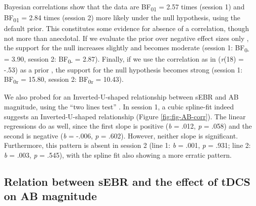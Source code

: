 \documentclass[11pt,english,]{memoir}
\begin{document}
Bayesian correlations show that the data are BF\textsubscript{01} = 2.57 times (session 1) and BF\textsubscript{01} = 2.84 times (session 2) more likely under the null hypothesis, using the default prior. This constitutes some evidence for absence of a correlation, though not more than anecdotal. If we evaluate the prior over negative effect sizes only \autocite[based on the negative correlation in][]{Colzato2008}, the support for the null increases slightly and becomes moderate (session 1: BF\textsubscript{0-} = 3.90, session 2: BF\textsubscript{0-} = 2.87). Finally, if we use the correlation as in \textcite{Colzato2008} (\emph{r}(18) = -.53) as a prior \autocite{Wagenmakers2016}, the support for the null hypothesis becomes strong (session 1: BF\textsubscript{0r} = 15.80, session 2: BF\textsubscript{0r} = 10.43).

We also probed for an Inverted-U-shaped relationship between sEBR and AB magnitude, using the ``two lines test'' \autocite{Simonsohn2018}. In session 1, a cubic spline-fit indeed suggests an Inverted-U-shaped relationship (Figure \ref{fig:fig-AB-corr}). The linear regressions do as well, since the first slope is positive (\emph{b} = .012, \emph{p} = .058) and the second is negative (\emph{b} = -.006, \emph{p} = .602). However, neither slope is significant. Furthermore, this pattern is absent in session 2 (line 1: \emph{b} = .001, \emph{p} = .931; line 2: \emph{b} = .003, \emph{p} = .545), with the spline fit also showing a more erratic pattern.

\hypertarget{relation-between-sebr-and-the-effect-of-tdcs-on-ab-magnitude-1}{%
\subsection{Relation between sEBR and the effect of tDCS on AB magnitude}\label{relation-between-sebr-and-the-effect-of-tdcs-on-ab-magnitude-1}}
\end{document}
